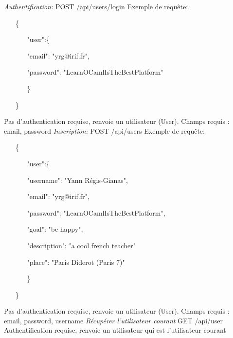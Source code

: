\documentclass{article}
\begin{document}
\newline
\newline
\textit{Authentification:}
\newline
POST /api/users/login
\newline
Exemple de requête:
\begin{itemize}
\item[\{]
\begin{itemize}
	\item[]
	\item["user":\{]
	\item[]"email": "yrg@irif.fr",
	\item[]"password": "LearnOCamlIsTheBestPlatform"
	\item[\}]
\end{itemize}
\item[\}]
\end{itemize}
Pas d'authentication requise, renvoie un utilisateur (User).
\newline
Champs requis : email, password
\newline
\newline
\textit{Inscription:}
\newline
POST /api/users
\newline
Exemple de requête:
\begin{itemize}
	\item[\{]
	\begin{itemize}
		\item[]
		\item["user":\{]
		\item[]"username": "Yann Régis-Gianas",
		\item[]"email": "yrg@irif.fr",
		\item[]"password": "LearnOCamlIsTheBestPlatform",
		\item[]"goal": "be happy",
		\item[]"description": "a cool french teacher"
		\item[]"place": "Paris Diderot (Paris 7)"
		\item[\}]
	\end{itemize}
	\item[\}]
\end{itemize}
Pas d'authentication requise, renvoie un utilisateur (User).
\newline
Champs requis : email, password, username
\newpage
\textit{Récupérer l'utilisateur courant}
\newline
GET /api/user
\newline
Authentification requise, renvoie un utilisateur qui est l'utilisateur courant
\end{document}
